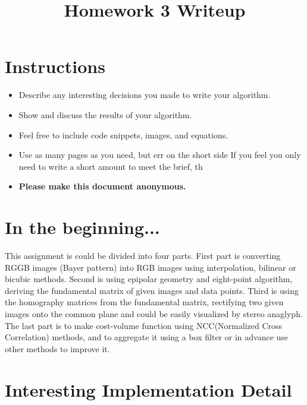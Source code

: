 \date{}

\title{\vspace{-1cm}Homework 3 Writeup}



\maketitle
\vspace{-3cm}
\thispagestyle{fancy}

\section*{Instructions}
\begin{itemize}
  \item Describe any interesting decisions you made to write your algorithm.
  \item Show and discuss the results of your algorithm.
  \item Feel free to include code snippets, images, and equations.
  \item Use as many pages as you need, but err on the short side If you feel you only need to write a short amount to meet the brief, th
  
  \item \textbf{Please make this document anonymous.}
\end{itemize}

\section*{In the beginning...}

 This assignment is could be divided into four parts. First part is converting RGGB images (Bayer pattern) into RGB images using interpolation, bilinear or bicubic methods. Second is using epipolar geometry and eight-point algorithm, deriving the fundamental matrix of given images and data points. Third is using the homography matrices from the fundamental matrix, rectifying two given images onto the common plane and could be easily visualized by stereo anaglyph. The last part is to make cost-volume function using NCC(Normalized Cross Correlation) methods, and to aggregate it using a box filter or in advance use other methods to improve it. 
  
\section*{Interesting Implementation Detail}

